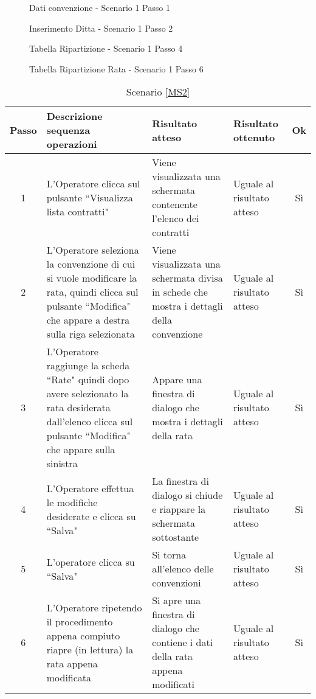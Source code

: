 \begin{figure}[h!]
	\centering
	\caption{Dati convenzione - Scenario 1 Passo 1}
	\label{tabDati}
\end{figure}

\begin{figure}[h!]
	\centering
	\caption{Inserimento Ditta - Scenario 1 Passo 2}
	\label{aggiungiDitta}
\end{figure}

\begin{figure}[h!]
	\centering
	\caption{Tabella Ripartizione - Scenario 1 Passo 4}
	\label{tabRip}
\end{figure}

\begin{figure}[h!]
	\centering
	\caption{Tabella Ripartizione Rata - Scenario 1 Passo 6}
	\label{tabRipRata}
\end{figure}


\vspace{3cm}

 {
 \footnotesize
  \begin{longtable}{|c|p{3cm}|p{3cm}|p{3cm}|c|}
    \caption{Scenario \ref{MS2}} \\
    \hline
    Passo & Descrizione sequenza operazioni & Risultato atteso & Risultato ottenuto & Ok\\
    \hline
    1 & L'Operatore clicca sul pulsante ``Visualizza lista contratti" & Viene visualizzata una schermata contenente l'elenco dei contratti & Uguale 
      al risultato atteso& Sì\\
    \hline
    2 & L'Operatore seleziona la convenzione di cui si vuole modificare la rata, quindi clicca sul pulsante ``Modifica" che appare a destra sulla riga selezionata& Viene visualizzata una schermata divisa in schede che mostra i dettagli
    della convenzione& Uguale al risultato atteso & Sì\\
    \hline
    3 & L'Operatore raggiunge la scheda ``Rate" quindi dopo avere selezionato la rata desiderata dall'elenco clicca sul pulsante ``Modifica" che appare sulla sinistra& Appare una finestra di dialogo che mostra i dettagli della rata & Uguale al risultato atteso & Sì\\
    \hline
    4 & L'Operatore effettua le modifiche desiderate e clicca su ``Salva" & La finestra di dialogo si chiude e riappare la schermata sottostante & Uguale al risultato atteso& Sì\\
    \hline
    5 & L'operatore clicca su ``Salva"& Si torna all'elenco delle convenzioni & Uguale al risultato atteso & Sì\\
    \hline
    6  & L'Operatore ripetendo il procedimento appena compiuto riapre (in lettura) la rata appena modificata & Si apre una finestra di dialogo che contiene i dati della rata appena modificati & Uguale al risultato atteso & Sì\\
    \hline
\end{longtable}
}


